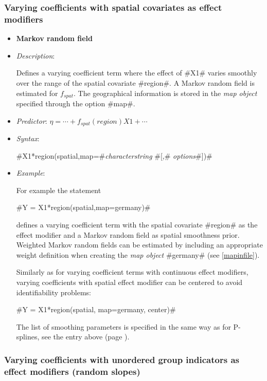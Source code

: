 \subsubsection*{ Varying coefficients with spatial covariates as
effect modifiers}

\begin{itemize}
\item[]{\bf\sffamily Markov random field}

\item[] {\em Description}:

Defines a varying coefficient term where the effect of #X1# varies
smoothly over the range of the spatial covariate #region#. A
Markov random field is estimated for $f_{spat}$. The geographical
information is stored in the {\em map object} specified through the
option #map#.
\item[] {\em Predictor}: $\eta = \cdots + f_{spat}(region)X1 + \cdots$
\item[] {\em Syntax}:

#X1*region(spatial,map=#{\it characterstring} #[,# {\it options}#])#
\item[] {\em Example}:

For example the statement

#Y = X1*region(spatial,map=germany)#

defines a varying coefficient term with the spatial covariate
#region# as the effect modifier and a Markov random field as spatial
smoothness prior. Weighted Markov random fields can be estimated by
including an appropriate weight definition when creating the {\em
map object} #germany# (see \autoref{mapinfile}).

Similarly as for varying coefficient terms with continuous effect
modifiers, varying coefficients with spatial effect modifier can be
centered to avoid identifiability problems:

#Y = X1*region(spatial, map=germany, center)#

The list of smoothing parameters is specified in the same way as for P-splines, see the entry above (page \pageref{psplines_stepwise}).
\end{itemize}

\subsubsection*{Varying coefficients with unordered group indicators
as effect modifiers (random slopes)}

